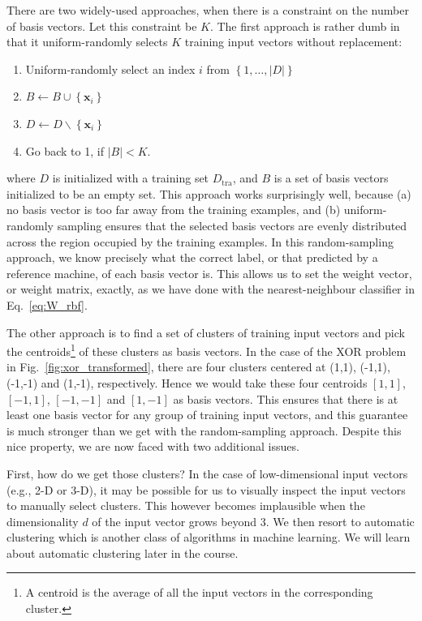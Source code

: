\documentclass{report}
\newcommand{\vect}[1]{\mathbf{#1}}
\newcommand{\vx}[0]{\vect{x}}
\newcommand{\tra}{\text{tra}}
\begin{document}
There are two widely-used approaches, when there is a constraint on the number
of basis vectors. Let this constraint be $K$. The first approach is rather dumb
in that it uniform-randomly selects $K$ training input vectors without
replacement:
\begin{enumerate}
    \item Uniform-randomly select an index $i$ from $\left\{ 1, \ldots, |D|
        \right\}$
    \item $B \leftarrow B \cup \left\{ \vx_i \right\}$
    \item $D \leftarrow D \backslash \left\{ \vx_i \right\}$
    \item Go back to 1, if $|B| < K$.
\end{enumerate}
where $D$ is initialized with a training set $D_{\tra}$, and $B$ is a set of
basis vectors initialized to be an empty set. This approach works surprisingly
well, because (a) no basis vector is too far away from the training examples,
and (b) uniform-randomly sampling ensures that the selected basis vectors are
evenly distributed across the region occupied by the training examples.
In this random-sampling approach, we know precisely what the correct label, or
that predicted by a reference machine, of each basis vector is. This allows us
to set the weight vector, or weight matrix, exactly, as we have done with the
nearest-neighbour classifier in Eq.~\eqref{eq:W_rbf}.

The other approach is to find a set of clusters of training input vectors and
pick the centroids\footnote{
    A centroid is the average of all the input vectors in the corresponding
    cluster.
}
of these clusters as basis vectors. In the case of the XOR problem in
Fig.~\ref{fig:xor_transformed}, there are four clusters centered at (1,1),
(-1,1), (-1,-1) and (1,-1), respectively. Hence we would take these four
centroids $\left[1,1\right]$, $\left[-1,1\right]$, $\left[-1,-1\right]$ and
$\left[1,-1\right]$ as basis vectors. This ensures that there is at least one
basis vector for any group of training input vectors, and this guarantee is much
stronger than we get with the random-sampling approach. Despite this nice
property, we are now faced with two additional issues. 

First, how do we get those clusters? In the case of low-dimensional input
vectors (e.g., 2-D or 3-D), it may be possible for us to visually inspect the
input vectors to manually select clusters. This however becomes implausible when
the dimensionality $d$ of the input vector grows beyond $3$. We then resort to
automatic clustering which is another class of algorithms in machine learning.
We will learn about automatic clustering later in the course. 
\end{document}
